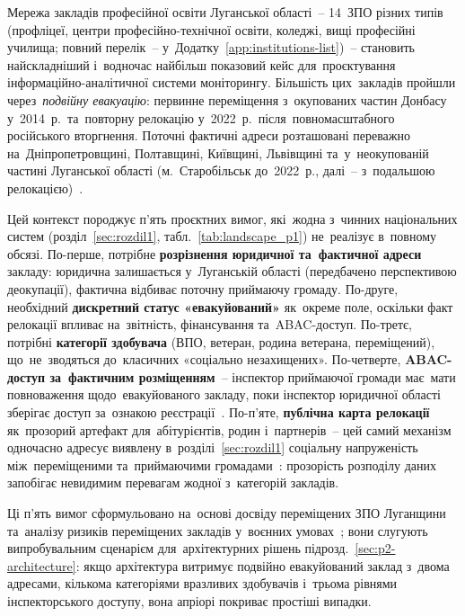 Мережа закладів професійної освіти Луганської області~-- 14~ЗПО різних типів (профліцеї, центри професійно-технічної освіти, коледжі, вищі професійні училища; повний перелік~-- у~Додатку~\ref{app:institutions-list})~-- становить найскладніший і~водночас найбільш показовий кейс для~проєктування інформаційно-аналітичної системи моніторингу. Більшість цих~закладів пройшли через~\emph{подвійну евакуацію}: первинне переміщення з~окупованих частин Донбасу у~2014~р.\ та~повторну релокацію у~2022~р.\ після~повномасштабного російського вторгнення. Поточні фактичні адреси розташовані переважно на~Дніпропетровщині, Полтавщині, Київщині, Львівщині та~у~неокупованій частині Луганської області (м.~Старобільськ до~2022~р., далі~-- з~подальшою релокацією)~\cite{NMTsPTO2025}.

Цей контекст породжує п'ять проєктних вимог, які~жодна з~чинних національних систем (розділ~\ref{sec:rozdil1}, табл.~\ref{tab:landscape_p1}) не~реалізує в~повному обсязі. По-перше, потрібне \textbf{розрізнення юридичної та~фактичної адреси} закладу: юридична залишається у~Луганській області (передбачено перспективою деокупації), фактична відбиває поточну приймаючу громаду. По-друге, необхідний \textbf{дискретний статус «евакуйований»} як~окреме поле, оскільки факт релокації впливає на~звітність, фінансування та~ABAC-доступ. По-третє, потрібні \textbf{категорії здобувача} (ВПО, ветеран, родина ветерана, переміщений), що~не~зводяться до~класичних «соціально незахищених». По-четверте, \textbf{ABAC-доступ за~фактичним розміщенням}~-- інспектор приймаючої громади має~мати повноваження щодо~евакуйованого закладу, поки інспектор юридичної області зберігає доступ за~ознакою реєстрації~\cite{Semenenko2023DisplacedHEI}. По-п'яте, \textbf{публічна карта релокації} як~прозорий артефакт для~абітурієнтів, родин і~партнерів~-- цей самий механізм одночасно адресує виявлену в~розділі~\ref{sec:rozdil1} соціальну напруженість між~переміщеними та~приймаючими громадами~\cite{Oliinyk2025IDP}: прозорість розподілу даних запобігає невидимим перевагам жодної з~категорій закладів.

Ці п'ять вимог сформульовано на~основі досвіду переміщених ЗПО Луганщини~\cite{NMTsPTO2025} та~аналізу ризиків переміщених закладів у~воєнних умовах~\cite{Bazhan2025PPTERisks}; вони слугують випробувальним сценарієм для~архітектурних рішень підрозд.~\ref{sec:p2-architecture}: якщо архітектура витримує подвійно евакуйований заклад з~двома адресами, кількома категоріями вразливих здобувачів і~трьома рівнями інспекторського доступу, вона апріорі покриває простіші випадки.

